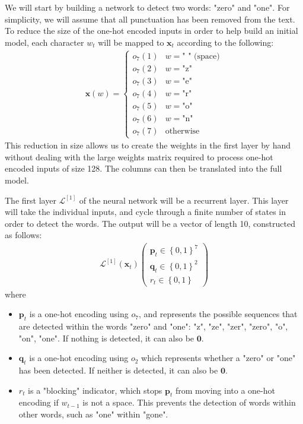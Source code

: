 \documentclass{somasmsc}
\begin{document}
We will start by building a network to detect two words: "zero" and "one". For simplicity, we will assume that all punctuation has been removed from the text. To reduce the size of the one-hot encoded inputs in order to help build an initial model, each character $w_t$ will be mapped to $\pmb{x}_t$ according to the following:
\begin{align}
    \mathbf{x}\left(w\right) =
    \begin{cases}
        o_7\left(1\right) & w = \text{" " (space)} \\
        o_7\left(2\right) & w = \text{"z"} \\
        o_7\left(3\right) & w = \text{"e"} \\
        o_7\left(4\right) & w = \text{"r"} \\
        o_7\left(5\right) & w = \text{"o"} \\
        o_7\left(6\right) & w = \text{"n"} \\
        o_7\left(7\right) & \text{otherwise}
    \end{cases}
\end{align}
This reduction in size allows us to create the weights in the first layer by hand without dealing with the large weights matrix required to process one-hot encoded inputs of size 128. The columns can then be translated into the full model.

The first layer $\mathcal{L}^{\left[1\right]}$ of the neural network will be a recurrent layer. This layer will take the individual inputs, and cycle through a finite number of states in order to detect the words. The output will be a vector of length 10, constructed as follows:
\begin{align}
    \mathcal{L}^{\left[1\right]}\left(\pmb{x}_t\right)
    \begin{pmatrix}
        \pmb{p}_t \in \left\{0,1\right\}^7 \\
        \pmb{q}_t \in \left\{0,1\right\}^2 \\
        r_t \in \left\{0,1\right\}
    \end{pmatrix}
\end{align}
where
\begin{itemize}
    \item $\mathbf{p}_t$ is a one-hot encoding using $o_7$, and represents the possible sequences that are detected within the words "zero" and "one": "z", "ze", "zer", "zero", "o", "on", "one". If nothing is detected, it can also be $\mathbf{0}$.
    \item $\mathbf{q}_t$ is a one-hot encoding using $o_2$ which represents whether a "zero" or "one" has been detected. If neither is detected, it can also be $\mathbf{0}$.
    \item $r_t$ is a "blocking" indicator, which stops $\mathbf{p}_t$ from moving into a one-hot encoding if $w_{t-1}$ is not a space. This prevents the detection of words within other words, such as "one" within "gone".
\end{itemize}
\end{document}
